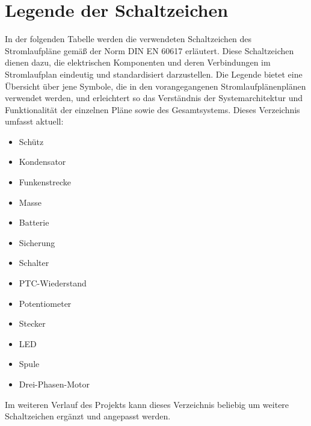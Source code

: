 
\addtocounter{page}{1}
\section*{Legende der Schaltzeichen}
In der folgenden Tabelle werden die verwendeten Schaltzeichen des Stromlaufpläne gemäß der Norm DIN EN 60617 erläutert. Diese Schaltzeichen dienen dazu, die elektrischen Komponenten und deren Verbindungen im Stromlaufplan eindeutig und standardisiert darzustellen. Die Legende bietet eine Übersicht über jene Symbole, die in den vorangegangenen Stromlaufplänenplänen verwendet werden, und erleichtert so das Verständnis der Systemarchitektur und Funktionalität der einzelnen Pläne sowie des Gesamtsystems. Dieses Verzeichnis umfasst aktuell:

\begin{multicols}{2}
	\begin{itemize}
		\item Schütz
		\item Kondensator
		\item Funkenstrecke
		\item Masse
		\item Batterie
		\item Sicherung
		\item Schalter
	\end{itemize}
	\columnbreak
	\begin{itemize}
		\item PTC-Wiederstand
		\item Potentiometer
		\item Stecker
		\item LED
		\item Spule
		\item Drei-Phasen-Motor
	\end{itemize}
\end{multicols}

Im weiteren Verlauf des Projekts kann dieses Verzeichnis beliebig um weitere Schaltzeichen ergänzt und angepasst werden.

